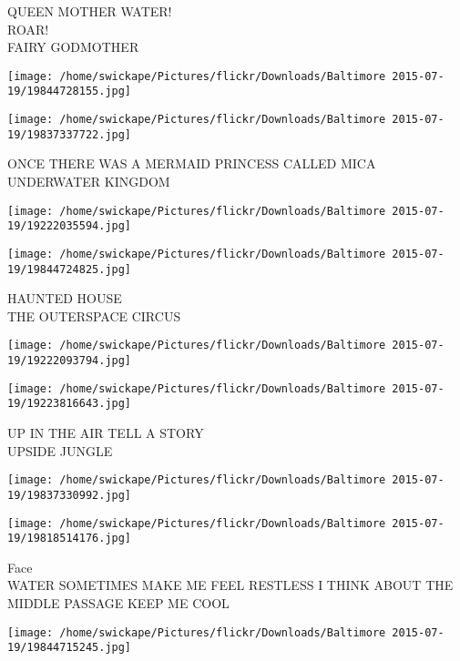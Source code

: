 \documentclass[10pt,letterpaper]{article}
\begin{document}
QUEEN MOTHER WATER!\\
ROAR!\\
FAIRY GODMOTHER\\
\pagebreak

\texttt{[image: /home/swickape/Pictures/flickr/Downloads/Baltimore 2015-07-19/19844728155.jpg]}

\vspace{0.25in}
\texttt{[image: /home/swickape/Pictures/flickr/Downloads/Baltimore 2015-07-19/19837337722.jpg]}

ONCE THERE WAS A MERMAID PRINCESS CALLED MICA\\
UNDERWATER KINGDOM\\
\pagebreak

\texttt{[image: /home/swickape/Pictures/flickr/Downloads/Baltimore 2015-07-19/19222035594.jpg]}

\vspace{0.25in}
\texttt{[image: /home/swickape/Pictures/flickr/Downloads/Baltimore 2015-07-19/19844724825.jpg]}

HAUNTED HOUSE\\
THE OUTERSPACE CIRCUS\\
\pagebreak

\texttt{[image: /home/swickape/Pictures/flickr/Downloads/Baltimore 2015-07-19/19222093794.jpg]}

\vspace{0.25in}
\texttt{[image: /home/swickape/Pictures/flickr/Downloads/Baltimore 2015-07-19/19223816643.jpg]}

UP IN THE AIR TELL A STORY\\
UPSIDE JUNGLE\\
\pagebreak

\texttt{[image: /home/swickape/Pictures/flickr/Downloads/Baltimore 2015-07-19/19837330992.jpg]}

\vspace{0.25in}
\texttt{[image: /home/swickape/Pictures/flickr/Downloads/Baltimore 2015-07-19/19818514176.jpg]}

Face\\
WATER SOMETIMES MAKE ME FEEL RESTLESS I THINK ABOUT THE MIDDLE PASSAGE KEEP ME COOL\\
\pagebreak

\texttt{[image: /home/swickape/Pictures/flickr/Downloads/Baltimore 2015-07-19/19844715245.jpg]}
\end{document}
